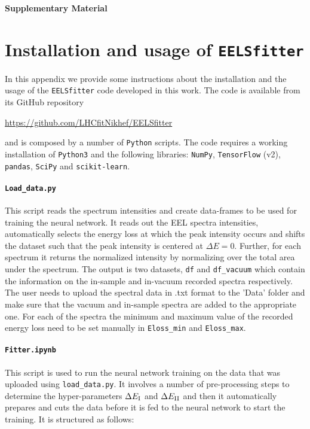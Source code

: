 
\clearpage
\begin{center}
  {\bf \LARGE Supplementary Material}
 \end{center}

\section{Installation and usage of {\tt EELSfitter}}
\label{sec:installation}

In this appendix we provide some instructions about the installation
and the usage of the {\tt EELSfitter} code developed
in this work.
%
The code is available from its GitHub repository
\begin{center}
\url{https://github.com/LHCfitNikhef/EELSfitter}
\end{center}
and is composed by a number of {\tt Python} scripts.
%
The code requires a working installation of {\tt Python3} and the following
libraries: {\tt NumPy}, {\tt TensorFlow} (v2), {\tt pandas}, {\tt SciPy} and {\tt scikit-learn}.  


\noindent
\paragraph{\tt Load\_data.py}
%
This script reads the spectrum
intensities and create data-frames to be used for training the neural network.
%
It reads out the EEL spectra intensities, automatically selects the energy loss
at which the peak intensity occurs and shifts the dataset such that
the peak intensity is centered at $\Delta E =$0. 
%
Further, for each spectrum it returns the normalized intensity by normalizing
over the total area under the spectrum. 
%
The output is two datasets, {\tt df} and {\tt df\_vacuum} which contain the 
information on the in-sample and in-vacuum recorded spectra respectively. 
%
The user needs to upload the spectral data in .txt format to the 'Data' folder
and make sure that the vacuum and in-sample spectra are added to the appropriate one.
%
For each of the spectra the minimum and maximum value of the recorded energy 
loss need to be set manually in {\tt Eloss\_min} and {\tt Eloss\_max}.

\noindent
\paragraph{\tt Fitter.ipynb}
%
This script is used to run the neural network training on the data that was 
uploaded using {\tt load\_data.py}.
%
It involves a number of pre-processing steps to determine the hyper-parameters $\Delta E_{\rm I}$
and $\Delta E_{\rm II}$ and then
it automatically prepares and cuts the data before it is fed
to the neural network to start the training.
%
It is structured as follows:

